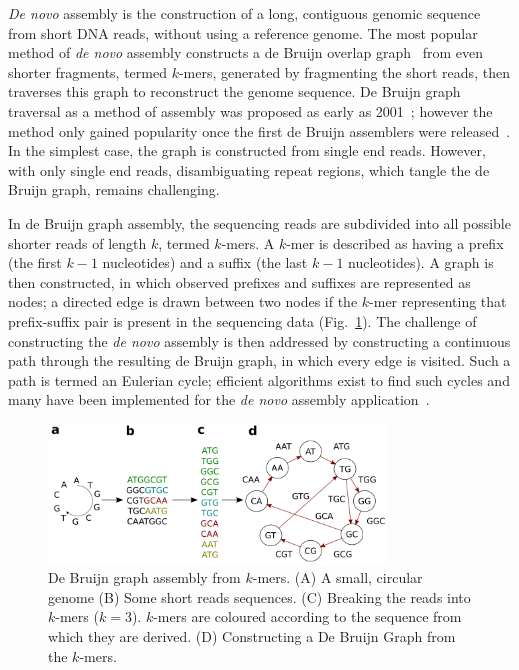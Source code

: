 \textit{De novo} assembly is the construction of a long, contiguous genomic sequence from short DNA reads, without using a reference genome. The most popular method of \textit{de novo} assembly constructs a de Bruijn overlap graph~\cite{Compeau2011} from even shorter fragments, termed $k$-mers, generated by fragmenting the short reads, then traverses this graph to reconstruct the genome sequence. De Bruijn graph traversal as a method of assembly was proposed as early as 2001~\cite{Pevzner2001}; however the method only gained popularity once the first de Bruijn assemblers were released~\cite{Zerbino2008}. In the simplest case, the graph is constructed from single end reads. However, with only single end reads, disambiguating repeat regions, which tangle the de Bruijn graph, remains challenging. 

In de Bruijn graph assembly, the sequencing reads are subdivided into all possible shorter reads of length $k$, termed $k$-mers. A $k$-mer is described as having a prefix (the first $k - 1$ nucleotides) and a suffix (the last $k - 1$ nucleotides). A graph is then constructed, in which observed prefixes and suffixes are represented as nodes; a directed edge is drawn between two nodes if the $k$-mer representing that prefix-suffix pair is present in the sequencing data (Fig.~\ref{fig:de-bruijn}). The challenge of constructing the \textit{de novo} assembly is then addressed by constructing a continuous path through the resulting de Bruijn graph, in which every edge is visited. Such a path is termed an Eulerian cycle; efficient algorithms exist to find such cycles and many have been implemented for the \textit{de novo} assembly application~\cite{Zerbino2008, Bankevich2012, Li2010_SOAP}. 

\begin{figure}
\centerline{\includegraphics[width=0.8\textwidth]{illumina/de_bruijn.pdf}}
\caption{De Bruijn graph assembly from $k$-mers. (A) A small, circular genome (B) Some short reads sequences. (C) Breaking the reads into $k$-mers ($k = 3$). $k$-mers are coloured according to the sequence from which they are derived. (D) Constructing a De Bruijn Graph from the $k$-mers.}
\label{fig:de-bruijn}
\end{figure}

